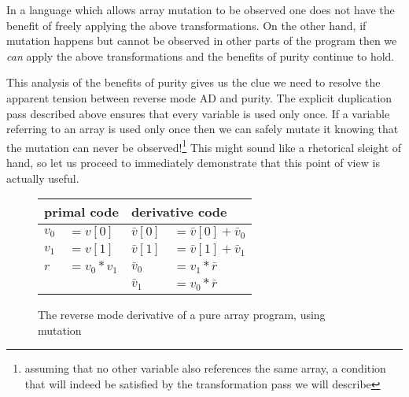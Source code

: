 \documentclass[12pt]{article}
\begin{document}
In a language which allows array mutation to be observed one does not
have the benefit of freely applying the above transformations.  On the
other hand, if mutation happens but cannot be observed in other parts
of the program then we \emph{can} apply the above transformations and
the benefits of purity continue to hold.

This analysis of the benefits of purity gives us the clue we need to
resolve the apparent tension between reverse mode AD and purity.  The
explicit duplication pass described above ensures that every variable
is used only once.  If a variable referring to an array is used only
once then we can safely mutate it knowing that the mutation can never
be observed!\footnote{assuming that no other variable also references
  the same array, a condition that will indeed be satisfied by the
  transformation pass we will describe} This might sound like a rhetorical
sleight of hand, so let us proceed to immediately demonstrate that
this point of view is actually useful.

\newcommand{\indexL}{\mathrm{index}}
\newcommand{\incL}{\mathrm{inc}}

\begin{figure}[t]
\center
\begin{tabular}[t]{ll|ll}
  \multicolumn{2}{l|}{primal code}
  &
  \multicolumn{2}{l}{derivative code}
  \\

  \hline

  $v_0$ & $= v[0]$
  &
  $\bar{v}[0]$ & $ = \bar{v}[0] + \bar{v}_0$
  \\
  
  $v_1$ & $ = v[1]$
  &
  $\bar{v}[1]$ & $ = \bar{v}[1] + \bar{v}_1$
  \\

  $r$ & $= v_0 * v_1$
  &
  $\bar{v}_0$ & $ = v_1 * \bar{r}$
  \\

  & &
  $\bar{v}_1$ & $ = v_0 * \bar{r}$
  \\
\end{tabular}
\caption{\label{array-program-mutating} The reverse mode derivative of
  a pure array program, using mutation}
\end{figure}
\end{document}
